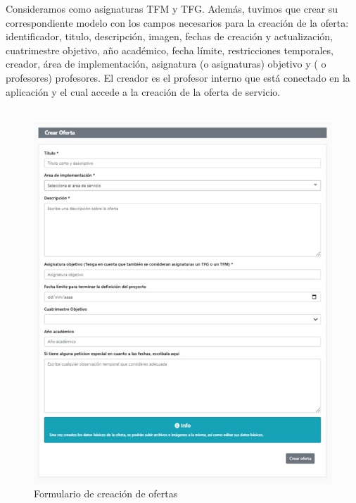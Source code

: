 \documentclass[11pt]{book}
\begin{document}
Consideramos como asignaturas TFM y TFG.
Además, tuvimos que crear su correspondiente modelo con los campos necesarios para la creación de la oferta: identificador, titulo, descripción, imagen, fechas de creación y actualización, cuatrimestre objetivo, año académico, fecha límite, restricciones temporales, creador, área de implementación, asignatura (o asignaturas) objetivo y ( o profesores) profesores. El creador es el profesor interno que está conectado en la aplicación y el cual accede a la creación de la oferta de servicio.\\\\


\begin{figure}[t]
	\centering
	\includegraphics[scale=0.9]{oferta}
	\caption{Formulario de creación de ofertas}
\end{figure}
\end{document}

